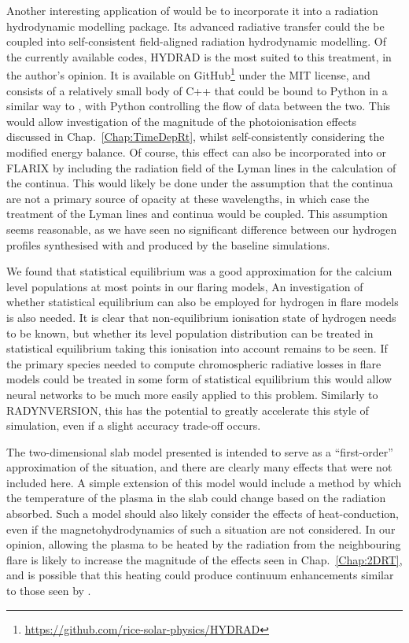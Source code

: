 Another interesting application of \Lw{} would be to incorporate it into a radiation hydrodynamic modelling package.
Its advanced radiative transfer could the be coupled into self-consistent field-aligned radiation hydrodynamic modelling.
Of the currently available codes, HYDRAD is the most suited to this treatment, in the author's opinion.
It is available on GitHub\footnote{\url{https://github.com/rice-solar-physics/HYDRAD}} under the MIT license, and consists of a relatively small body of C++ that could be bound to Python in a similar way to \Lw{}, with Python controlling the flow of data between the two.
This would allow investigation of the magnitude of the \Caii{} photoionisation effects discussed in Chap.~\ref{Chap:TimeDepRt}, whilst self-consistently considering the modified energy balance.
Of course, this effect can also be incorporated into \Radyn{} or FLARIX by including the radiation field of the Lyman lines in the calculation of the \Caii{} continua.
This would likely be done under the assumption that the \Caii{} continua are not a primary source of opacity at these wavelengths, in which case the treatment of the Lyman lines and \Caii{} continua would be coupled. This assumption seems reasonable, as we have seen no significant difference between our hydrogen profiles synthesised with \Lw{} and produced by the baseline \Radyn{} simulations.

We found that statistical equilibrium was a good approximation for the calcium level populations at most points in our flaring models,
An investigation of whether statistical equilibrium can also be employed for hydrogen in flare models is also needed.
It is clear that non-equilibrium ionisation state of hydrogen needs to be known, but whether its level population distribution can be treated in statistical equilibrium taking this ionisation into account remains to be seen.
If the primary species needed to compute chromospheric radiative losses in flare models could be treated in some form of statistical equilibrium this would allow neural networks to be much more easily applied to this problem.
Similarly to RADYNVERSION, this has the potential to greatly accelerate this style of simulation, even if a slight accuracy trade-off occurs.

The two-dimensional slab model presented is intended to serve as a ``first-order'' approximation of the situation, and there are clearly many effects that were not included here.
A simple extension of this model would include a method by which the temperature of the plasma in the slab could change based on the radiation absorbed.
Such a model should also likely consider the effects of heat-conduction, even if the magnetohydrodynamics of such a situation are not considered.
In our opinion, allowing the plasma to be heated by the radiation from the neighbouring flare is likely to increase the magnitude of the effects seen in Chap.~\ref{Chap:2DRT}, and is possible that this heating could produce continuum enhancements similar to those seen by \citet{Isobe2007}.

